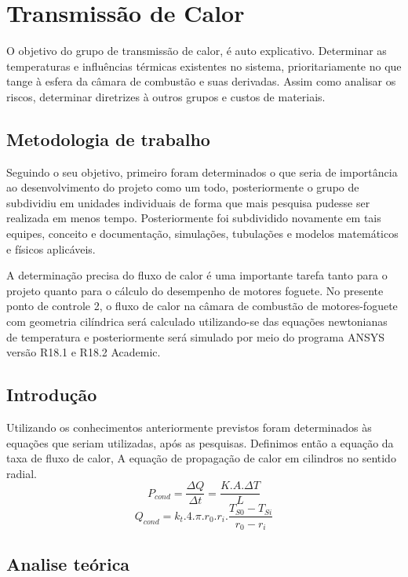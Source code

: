 \section{Transmissão de Calor}

O objetivo do grupo de transmissão de calor, é auto explicativo. Determinar as temperaturas e influências térmicas existentes no sistema, prioritariamente no que tange à esfera da câmara de combustão e suas derivadas. Assim como analisar os riscos, determinar diretrizes à outros grupos e custos de materiais.

\subsection{Metodologia de trabalho}

Seguindo o seu objetivo, primeiro foram determinados o que seria de importância ao desenvolvimento do projeto como um todo, posteriormente o grupo de subdividiu em unidades individuais de forma que mais pesquisa pudesse ser realizada em menos tempo. Posteriormente foi subdividido novamente em tais equipes, conceito e documentação, simulações, tubulações e modelos matemáticos e físicos aplicáveis.

A determinação precisa do fluxo de calor é uma importante tarefa tanto para o projeto quanto para o cálculo do desempenho de motores foguete. No presente ponto de controle 2, o fluxo de calor na câmara de combustão de motores-foguete com geometria cilíndrica será calculado utilizando-se das equações newtonianas de temperatura e posteriormente será simulado por meio do programa ANSYS versão R18.1 e R18.2 Academic.

\subsection{Introdução}

Utilizando os conhecimentos anteriormente previstos foram determinados às equações que seriam utilizadas, após as pesquisas. Definimos então a equação da taxa de fluxo de calor, A equação de propagação de calor em cilindros no sentido radial.\\
$$ P_{cond} = \frac{\Delta Q}{\Delta t} = \frac{K.A.\Delta T}{L}$$
$$ Q_{cond} = k_{t}.4.\pi.r_{0}.r_{i}.\frac{T_{S0}-T_{Si}}{r_{0}-r_{i}}$$

\subsection{Analise teórica}
